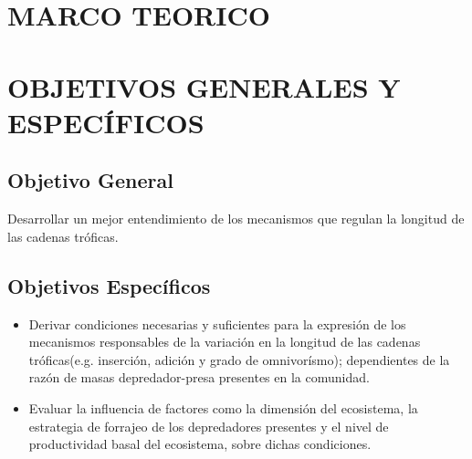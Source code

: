 \documentclass [12pt]{article}
\numberwithin{equation}{section}
\begin{document}
\setcounter{tocdepth}{3}
\tableofcontents
\listoffigures
\listoftables




\section{MARCO TEORICO}


\section{OBJETIVOS GENERALES Y ESPEC\'IFICOS}
\subsection{Objetivo General}
Desarrollar un mejor entendimiento de los mecanismos que regulan la longitud de las cadenas tr\'oficas.
\subsection{Objetivos Espec\'ificos}
\begin{itemize}
\item Derivar condiciones necesarias y suficientes para la expresi\'on de los mecanismos responsables de la variaci\'on en la longitud de las cadenas tr\'oficas(e.g. inserci\'on, adici\'on y  grado de omnivor\'ismo); dependientes de la raz\'on de masas depredador-presa presentes en la comunidad.
\item Evaluar la influencia de factores como la dimensi\'on del ecosistema, la estrategia de forrajeo de los depredadores presentes y el nivel de productividad basal del ecosistema, sobre dichas condiciones.
\end{itemize}
\end{document}
